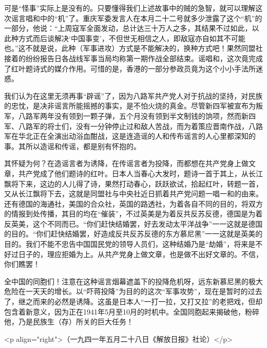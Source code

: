 可是“怪事”实际上是没有的。只要懂得我们上述故事中的贼的急智，就可以理解这次谣言唱和中的“机”了。重庆军委发言人在本月二十二号就多少泄露了这个“机”的一部分，他说：“上周寇军全面发动，总计达三十万人之多，其结果不过如此，以此种方式而后谈解决‘中国事变’，不但世无相信之人，即敌寇亦自如其不可能也。”这不就是说，此种（军事进攻）方式是不能解决的，换种方式吧！果然同盟社接着的纷纷报告日各战线军事当局均称第一期作战全部结束。谣唱和，这次竟完成了红叶题诗式的媒介作用。可惜的是，香港的一部分参政员竟为这个小小手法所迷惑。

我们认为在这里无须再事“辟谣”了，因为八路军共产党人对于抗战的坚持，对民族的忠忱，是决非谣言所能摇撼的事实，是不怕火烧的真金。尽管新四军被宣布为叛军，八路军两年没有领到一颗子弹，五个月没有领到半文制钱的饷项，然而新四军、八路军的将士们，没有一分钟停止过和敌人苦战，而为着策应晋南作战，八路军在华北正在全演出动浴血酣战，这是连造谣的人和传布谣言的人心里都深知的事。其所以造谣和传谣，都是别有怀抱的。

其怀疑为何？在造谣言者为诱降，在传谣言者为投降，而都想在共产党身上做文章，共产党成了他们题诗的红叶。日本人当春心大发时，题诗一首于其上，从长江飘将下来，这边的人儿得了诗，果然打动春心，跃跃欲试，拾起红叶，转题一首，又从长江飘将下去，这就是同盟社与中央社近日抓着共产党问题一唱一和的由来。还有德国的海通社，美国的合众社，英国的路透社，为着各自不同的目的，将双方的情报到处传播，其目的均在“催装”，不过英美是为着反共反苏反德，德国是为着反英美，这个不同而已。“你们赶快结婚罢，好去发动太平洋战争”一一这就是德国的目的。“你们赶快结婚罢，好造成反共反苏反德的东方慕尼黑”一一这就是英美的目的。我们不能不忠告中国国民党的领导人员们，这种结婚乃是“劫婚”，将来是不好过日子的，理应拒婚为上。从共产党身上做文章，也是做不出好文章的。不信，你们瞧罢！

全中国的同胞们！注意在这种谣言烟幕遮盖下的投降危机呀，远东新慕尼黑的极大危险在一天天的增长。以“吓蒋投降”为目的的这次“军事攻势”，现在是暂时的过去了，继之而来的必然是诱降。这虽是日本人“一打一拉，又打又拉”的老把戏，但却包含着新意义，因为正在1941年5月至10月的时机中。全国同胞起来揭破他，粉碎他，乃是民族生（存）所关的巨大任务！

<p align="right">（一九四一年五月二十八日《解放日报》社论）</p>

